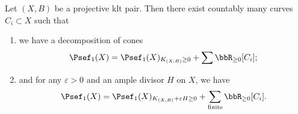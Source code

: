     \begin{theorem}\label{thm: cone theorem}
        Let \((X,B)\) be a projective klt pair.
        Then there exist countably many curves \(C_i \subset X\) 
        such that 
        \begin{enumerate}
            \item we have a decomposition of cones
            \[ \Psef_1(X) = \Psef_1(X)_{K_{(X,B)} \geq 0} + \sum \bbR_{\geq 0}[C_i]; \]
            \item and for any \(\varepsilon > 0\) and an ample divisor \(H\) on \(X\), we have 
            \[ \Psef_1(X) = \Psef_1(X)_{K_{(X,B)}+\varepsilon H \geq 0} + \sum_{\text{finite}} \bbR_{\geq 0}[C_i]. \]
        \end{enumerate}
    \end{theorem}
